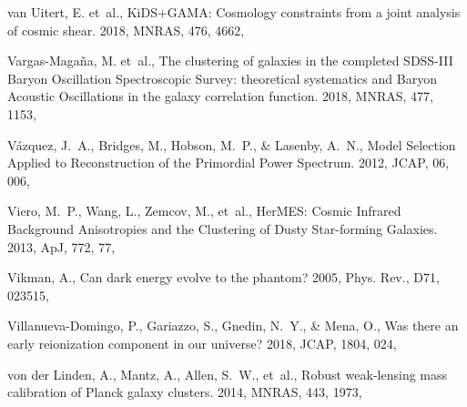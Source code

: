 \documentclass[longauth,traditabstract]{aa}
\def\apj{{ApJ}}
\def\mnras{{MNRAS}}
\def\jcap{{JCAP}}
\begin{document}
\begin{thebibliography}{379}
van Uitert, E. {et~al.}, {KiDS+GAMA: Cosmology constraints from a joint
  analysis of cosmic shear}. 2018, \mnras, 476, 4662, 

Vargas-Magaña, M. {et~al.}, {The clustering of galaxies in the completed
  SDSS-III Baryon Oscillation Spectroscopic Survey: theoretical systematics and
  Baryon Acoustic Oscillations in the galaxy correlation function}. 2018,
  \mnras, 477, 1153, 

V{\'a}zquez, J.~A., Bridges, M., Hobson, M.~P., \& Lasenby, A.~N., Model
  Selection Applied to Reconstruction of the {{Primordial Power Spectrum}}.
  2012, \jcap, 06, 006, 

{Viero}, M.~P., {Wang}, L., {Zemcov}, M., {et~al.}, {HerMES: Cosmic Infrared
  Background Anisotropies and the Clustering of Dusty Star-forming Galaxies}.
  2013, \apj, 772, 77, 

Vikman, A., {Can dark energy evolve to the phantom?} 2005, Phys. Rev., D71,
  023515, 

Villanueva-Domingo, P., Gariazzo, S., Gnedin, N.~Y., \& Mena, O., {Was there an
  early reionization component in our universe?} 2018, JCAP, 1804, 024,

{von der Linden}, A., {Mantz}, A., {Allen}, S.~W., {et~al.}, {Robust
  weak-lensing mass calibration of Planck galaxy clusters}. 2014, \mnras, 443,
  1973, 


\end{thebibliography}
\end{document}

